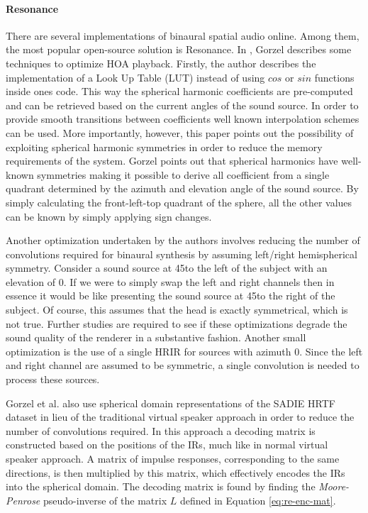 \paragraph{Resonance}

There are several implementations of binaural spatial audio online. Among them, the most popular open-source solution is Resonance. In \cite{gorzel2019efficient}, Gorzel describes some techniques to optimize HOA playback. Firstly, the author describes the implementation of a Look Up Table (LUT) instead of using $cos$ or $sin$ functions inside ones code. This way the spherical harmonic coefficients are pre-computed and can be retrieved based on the current angles of the sound source. In order to provide smooth transitions between coefficients well known interpolation schemes can be used. More importantly, however, this paper points out the possibility of exploiting spherical harmonic symmetries in order to reduce the memory requirements of the system. Gorzel points out that spherical harmonics have well-known symmetries making it possible to derive all coefficient from a single quadrant determined by the azimuth and elevation angle of the sound source. By simply calculating the front-left-top quadrant of the sphere, all the other values can be known by simply applying sign changes. 

Another optimization undertaken by the authors involves reducing the number of convolutions required for binaural synthesis by assuming left/right hemispherical symmetry. Consider a sound source at 45\textdegree to the left of the subject with an elevation of 0\textdegree. If we were to simply swap the left and right channels then in essence it would be like presenting the sound source at 45\textdegree to the right of the subject. Of course, this assumes that the head is exactly symmetrical, which is not true. Further studies are required to see if these optimizations degrade the sound quality of the renderer in a substantive fashion. Another small optimization is the use of a single HRIR for sources with azimuth 0. Since the left and right channel are assumed to be symmetric, a single convolution is needed to process these sources. 

Gorzel et al. also use spherical domain representations of the SADIE HRTF dataset in lieu of the traditional virtual speaker approach in order to reduce the number of convolutions required. In this approach a decoding matrix is constructed based on the positions of the IRs, much like in normal virtual speaker approach. A matrix of impulse responses, corresponding to the same directions, is then multiplied by this matrix, which effectively encodes the IRs into the spherical domain. The decoding matrix is found by finding the \textit{Moore-Penrose} pseudo-inverse of the matrix $L$ defined in Equation \ref{eq:re-enc-mat}. 

